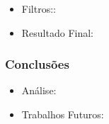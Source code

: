 \documentclass[brazil]{beamer}
\begin{document}
\begin{frame}
  \begin{itemize}
      \item Filtros::
              
  \end{itemize} 
\end{frame}

\begin{frame}
  \begin{itemize}
      \item Resultado Final:
              
  \end{itemize} 
\end{frame}


\begin{frame}
\frametitle{Conclusões}
  \begin{itemize}
      \item Análise:
      
      \item Trabalhos Futuros:
              
  \end{itemize} 
\end{frame}
\end{document}
